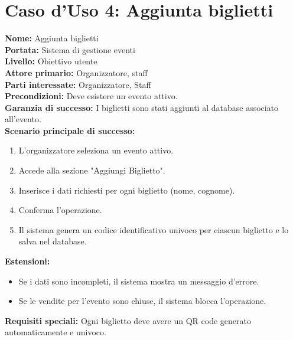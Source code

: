 \documentclass[a4paper,12pt]{article}
\begin{document}
\section*{\textcolor{sectioncolor}{Caso d'Uso 4: Aggiunta biglietti}}
\textcolor{textcolor}{
\textbf{Nome:} Aggiunta biglietti\\
\textbf{Portata:} Sistema di gestione eventi\\
\textbf{Livello:} Obiettivo utente\\
\textbf{Attore primario:} Organizzatore, staff\\
\textbf{Parti interessate:} Organizzatore, Staff\\
\textbf{Precondizioni:} Deve esistere un evento attivo.\\
\textbf{Garanzia di successo:} I biglietti sono stati aggiunti al database associato all'evento.\\
\textbf{Scenario principale di successo:}
\begin{enumerate}
    \item L'organizzatore seleziona un evento attivo.
    \item Accede alla sezione "Aggiungi Biglietto".
    \item Inserisce i dati richiesti per ogni biglietto (nome, cognome).
    \item Conferma l'operazione.
    \item Il sistema genera un codice identificativo univoco per ciascun biglietto e lo salva nel database.
\end{enumerate}
\textbf{Estensioni:}
\begin{itemize}
    \item Se i dati sono incompleti, il sistema mostra un messaggio d'errore.
    \item Se le vendite per l'evento sono chiuse, il sistema blocca l'operazione.
\end{itemize}
\textbf{Requisiti speciali:} Ogni biglietto deve avere un QR code generato automaticamente e univoco.


}
\end{document}
